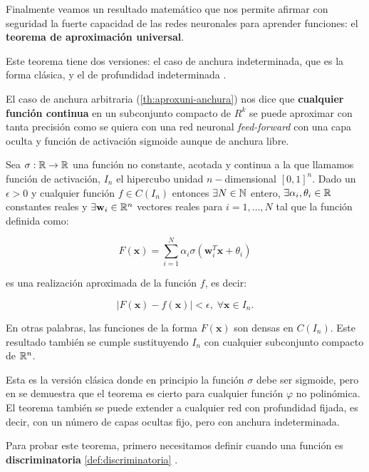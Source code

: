 Finalmente veamos un resultado matemático que nos permite afirmar con seguridad la fuerte capacidad de las redes neuronales para aprender funciones: el \textbf{teorema de aproximación universal}.

Este teorema tiene dos versiones: el caso de anchura indeterminada, que es la forma clásica, \cite{cybenko1989approximation} y el de profundidad indeterminada \cite{lu2017expressive}.

El caso de anchura arbitraria (\autoref{th:aproxuni-anchura}) nos dice que \textbf{cualquier función continua} en un subconjunto compacto de $R^k$ se puede aproximar con tanta precisión como se quiera con una red neuronal \emph{feed-forward} con una capa oculta y función de activación sigmoide aunque de anchura libre.

\begin{teorema}
  Sea $\sigma : \mathbb{R} \to \mathbb{R}$ una función no constante, acotada y continua a la que llamamos función de activación, $I_n$ el hipercubo unidad $n-$dimensional $[0, 1]^n$. Dado un $\epsilon > 0$ y cualquier función $f \in C(I_n)$ entonces $\exists N \in \mathbb{N}$ entero, $\exists \alpha_i, \theta_i \in \mathbb{R}$ constantes reales y $\exists \textbf{w}_i \in \mathbb{R}^n$ vectores reales para $i = 1, \ldots, N$ tal que la función definida como:

  $$F(\textbf{x}) = \sum \limits^N_{i = 1} \alpha_i \sigma \left(\textbf{w}^T_i \textbf{x} + \theta_i \right)$$

  es una realización aproximada de la función $f$, es decir:

  $$|F(\textbf{x}) - f(\textbf{x})| < \epsilon, \; \forall \textbf{x} \in I_n.$$

  En otras palabras, las funciones de la forma $F(\textbf{x})$ son densas en $C(I_n)$. Este resultado también se cumple sustituyendo $I_n$ con cualquier subconjunto compacto de $\mathbb{R}^n$.
  \label{th:aproxuni-anchura}
\end{teorema}

Esta es la versión clásica donde en principio la función $\sigma$ debe ser sigmoide, pero en \cite{leshno1993multilayer} se demuestra que el teorema es cierto para cualquier función $\varphi$ no polinómica. El teorema también se puede extender a cualquier red con profundidad fijada, es decir, con un número de capas ocultas fijo, pero con anchura indeterminada.

Para probar este teorema, primero necesitamos definir cuando una función es \textbf{discriminatoria} \autoref{def:discriminatoria} \cite{cybenko1989approximation}.

